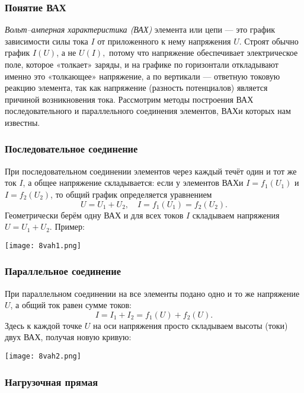 \documentclass[12pt, a4paper]{article}%
\begin{document}
\subsubsection*{Понятие ВАХ}

\textit{Вольт–амперная характеристика (ВАХ)} элемента или цепи — это график зависимости силы тока $I$ от приложенного к нему напряжения $U$.
Строят обычно график $I(U)$, а не $U(I),$ потому что напряжение обеспечивает электрическое поле, которое «толкает» заряды, и на графике
по горизонтали откладывают именно это «толкающее» напряжение, а по вертикали — ответную токовую реакцию элемента,
так как напряжение (разность потенциалов) является причиной возникновения тока. Рассмотрим методы построения ВАХ последовательного и параллельного соединения элементов, ВАХи которых нам известны. 

\subsubsection*{Последовательное соединение}

При последовательном соединении элементов через каждый течёт один и тот же ток $I$, а общее напряжение складывается: если у элементов ВАХи $I=f_1(U_1)$ и $I=f_2(U_2)$, то общий график определяется уравнением
\[
U = U_1 + U_2,
\quad
I = f_1(U_1)=f_2(U_2).
\]
Геометрически берём одну ВАХ и для всех токов $I$ складываем напряжения $U = U_1+U_2$. Пример:

\begin{center}
\texttt{[image: 8vah1.png]}
\label{fig:mpr}
\end{center}

\subsubsection*{Параллельное соединение}

При параллельном соединении на все элементы подано одно и то же напряжение $U$, а общий ток равен сумме токов:
\[
I = I_1 + I_2 = f_1(U) + f_2(U).
\]
Здесь к каждой точке $U$ на оси напряжения просто складываем высоты (токи) двух ВАХ, получая новую кривую:

\begin{center}
\texttt{[image: 8vah2.png]}
\label{fig:mpr}
\end{center}


\subsubsection*{Нагрузочная прямая}
\end{document}
